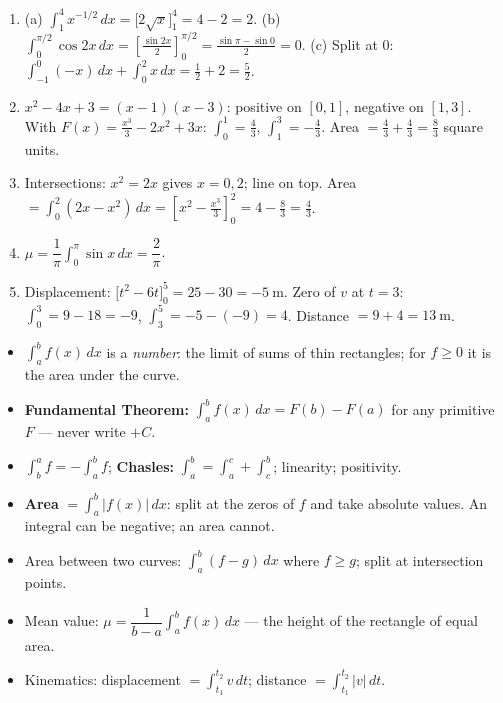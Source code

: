 \documentclass[11pt]{article}
\begin{document}
\begin{corrige}[Exercise 1]
\begin{enumerate}
\item (a) $\displaystyle\int_1^4 x^{-1/2}\,dx = \Big[2\sqrt{x}\Big]_1^4 = 4 - 2 = 2$.
(b) $\displaystyle\int_0^{\pi/2} \cos 2x\,dx = \left[\frac{\sin 2x}{2}\right]_0^{\pi/2} = \frac{\sin\pi - \sin 0}{2} = 0$.
(c) Split at $0$: $\displaystyle\int_{-1}^0 (-x)\,dx + \int_0^2 x\,dx = \frac{1}{2} + 2 = \frac{5}{2}$.
\item $x^2 - 4x + 3 = (x-1)(x-3)$: positive on $[0,1]$, negative on $[1,3]$. With $F(x) = \frac{x^3}{3} - 2x^2 + 3x$: $\int_0^1 = \frac{4}{3}$, $\int_1^3 = -\frac{4}{3}$. Area $= \frac{4}{3} + \frac{4}{3} = \frac{8}{3}$ square units.
\item Intersections: $x^2 = 2x$ gives $x = 0, 2$; line on top. Area $= \displaystyle\int_0^2 (2x - x^2)\,dx = \left[x^2 - \frac{x^3}{3}\right]_0^2 = 4 - \frac{8}{3} = \frac{4}{3}$.
\item $\mu = \dfrac{1}{\pi}\displaystyle\int_0^{\pi} \sin x\,dx = \dfrac{2}{\pi}$.
\item Displacement: $\Big[t^2 - 6t\Big]_0^5 = 25 - 30 = -5\ \mathrm{m}$. Zero of $v$ at $t = 3$: $\int_0^3 = 9 - 18 = -9$, $\int_3^5 = -5 - (-9) = 4$. Distance $= 9 + 4 = 13\ \mathrm{m}$.
\end{enumerate}
\end{corrige}

\begin{aretenir}
\begin{itemize}
\item $\displaystyle\int_a^b f(x)\,dx$ is a \emph{number}: the limit of sums of thin rectangles; for $f \geq 0$ it is the area under the curve.
\item \textbf{Fundamental Theorem:} $\displaystyle\int_a^b f(x)\,dx = F(b) - F(a)$ for any primitive $F$ — never write $+C$.
\item $\displaystyle\int_b^a f = -\int_a^b f$; \textbf{Chasles:} $\displaystyle\int_a^b = \int_a^c + \int_c^b$; linearity; positivity.
\item \textbf{Area} $= \displaystyle\int_a^b |f(x)|\,dx$: split at the zeros of $f$ and take absolute values. An integral can be negative; an area cannot.
\item Area between two curves: $\displaystyle\int_a^b (f - g)\,dx$ where $f \geq g$; split at intersection points.
\item Mean value: $\mu = \dfrac{1}{b-a}\displaystyle\int_a^b f(x)\,dx$ — the height of the rectangle of equal area.
\item Kinematics: displacement $= \displaystyle\int_{t_1}^{t_2} v\,dt$; distance $= \displaystyle\int_{t_1}^{t_2} |v|\,dt$.
\end{itemize}
\end{aretenir}
\end{document}
